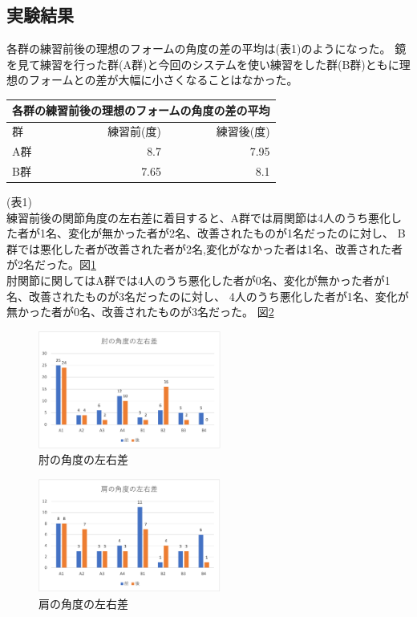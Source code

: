 \documentclass[a4j,10pt]{jsarticle}
\begin{document}
\subsection{実験結果}
各群の練習前後の理想のフォームの角度の差の平均は(表1)のようになった。
鏡を見て練習を行った群(A群)と今回のシステムを使い練習をした群(B群)ともに理想のフォームとの差が大幅に小さくなることはなかった。
\begin{center}
    \begin{tabular}{|l|r|r|} \hline
      \multicolumn{3}{|c|}{各群の練習前後の理想のフォームの角度の差の平均} \\ \hline
      群 & 練習前(度) & 練習後(度) \\ \hline
      A群 & 8.7 & 7.95 \\
      B群& 7.65 & 8.1 \\ \hline
    \end{tabular}
\end{center}
(表1)\\
練習前後の関節角度の左右差に着目すると、A群では肩関節は4人のうち悪化した者が1名、変化が無かった者が2名、改善されたものが1名だったのに対し、
B群では悪化した者が改善された者が2名,変化がなかった者は1名、改善された者が2名だった。図\ref{elbow} \\
肘関節に関してはA群では4人のうち悪化した者が0名、変化が無かった者が1名、改善されたものが3名だったのに対し、
4人のうち悪化した者が1名、変化が無かった者が0名、改善されたものが3名だった。 図\ref{shoulder}
\begin{figure}[htbp]
    \begin{center}
        \includegraphics[width=6cm]{elbow.png}
        \caption{肘の角度の左右差}
        \label{elbow}
    \end{center}
\end{figure}
\begin{figure}[htbp]
    \begin{center}
        \includegraphics[width=6cm]{shoulder.png}
        \caption{肩の角度の左右差}
        \label{shoulder}
    \end{center}
\end{figure}
\end{document}
